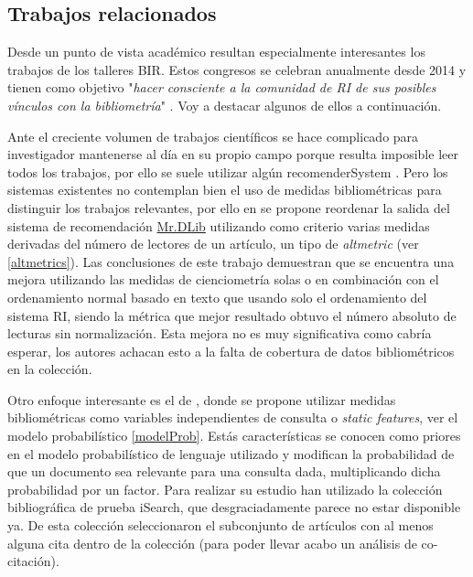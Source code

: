 \subsection{Trabajos relacionados}
Desde un punto de vista académico resultan especialmente interesantes los trabajos de los talleres \acrfull{BIR}. Estos congresos se celebran anualmente desde 2014 y tienen como objetivo "\textit{hacer consciente a la comunidad de \acrshort{RI} de sus posibles vínculos con la bibliometría}" \cite{DBLP:conf/ecir/X14}. Voy a destacar algunos de ellos a continuación.

Ante el creciente volumen de trabajos científicos se hace complicado para investigador mantenerse al día en su propio campo porque resulta imposible leer todos los trabajos, por ello se suele utilizar algún \gls{recomenderSystem} . Pero los sistemas existentes no contemplan bien el uso de medidas bibliométricas para distinguir los trabajos relevantes, por ello en \cite{DBLP:conf/ecir/SiebertDF17} se propone reordenar la salida del sistema de recomendación \href{mr-dlib.org}{\acrshort{Mr.DLib}} utilizando como criterio varias medidas derivadas del número de lectores de un artículo, un tipo de \textit{altmetric} (ver \ref{altmetrics}). Las conclusiones de este trabajo demuestran que se encuentra una mejora utilizando las medidas de cienciometría solas o en combinación con el ordenamiento normal basado en texto que usando solo el ordenamiento del sistema \acrshort{RI}, siendo la métrica que mejor resultado obtuvo el número absoluto de lecturas sin normalización. Esta mejora no es muy significativa como cabría esperar, los autores achacan esto a la falta de cobertura de datos bibliométricos en la colección.

Otro enfoque interesante es el de \cite{DBLP:conf/ecir/ZhaoH14}, donde se propone utilizar medidas bibliométricas como variables independientes de consulta o \textit{static features}, ver el modelo probabilístico \ref{modelProb}. Estás características se conocen como priores en el modelo probabilístico de lenguaje utilizado y modifican la probabilidad de que un documento sea relevante para una consulta dada, multiplicando dicha probabilidad por un factor. Para realizar su estudio han utilizado la colección bibliográfica de prueba iSearch, que desgraciadamente parece no estar disponible ya. De esta colección seleccionaron el subconjunto de artículos con al menos alguna cita dentro de la colección (para poder llevar acabo un análisis de co-citación). 

